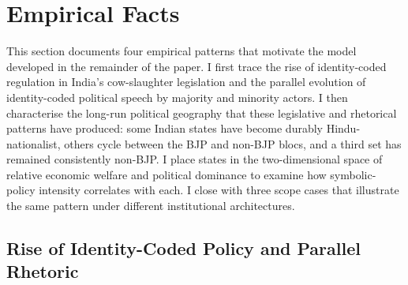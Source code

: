 
\section{Empirical Facts} \label{sec:empirical_facts}

This section documents four empirical patterns that motivate the model
developed in the remainder of the paper. I first trace the rise of
identity-coded regulation in India's cow-slaughter legislation and the
parallel evolution of identity-coded political speech by majority and
minority actors. I then characterise the long-run
political geography that these legislative and rhetorical patterns have
produced: some Indian states have become durably Hindu-nationalist, others
cycle between the BJP and non-BJP blocs, and a third set has remained
consistently non-BJP. I place states in the
two-dimensional space of relative economic welfare and political dominance to
examine how symbolic-policy intensity correlates with each. 
I close with three scope cases that illustrate the same pattern under
different institutional architectures. 

\subsection{Rise of Identity-Coded Policy and Parallel Rhetoric}
\label{subsec:d_narrative}

